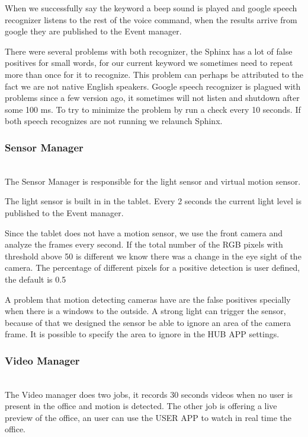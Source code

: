When we successfully say the keyword a beep sound is played and google speech recognizer listens to the rest of the voice command, when the results arrive from google they are published to the Event manager.

There were several problems with both recognizer, the Sphinx has a lot of false positives for small words, for our current keyword we sometimes need to repeat more than once for it to recognize. This problem can perhaps be attributed to the fact we are not native English speakers. 
Google speech recognizer is plagued with problems since a few version ago, it sometimes will not listen and shutdown after some 100 ms. To try to minimize the problem by run a check every 10 seconds. If both speech recognizes are not running we relaunch Sphinx.

\subsubsection{Sensor Manager}\label{sensor_manager_imp}\mbox{}\\

The Sensor Manager is responsible for the light sensor and virtual motion sensor.

The light sensor is built in in the tablet. Every 2 seconds the current light level is published to the Event manager. 

Since the tablet does not have a motion sensor, we use the front camera and analyze the frames every second. If the total number of the RGB pixels with threshold above 50 is different we know there was a change in the eye sight of the camera. The percentage of different pixels for a positive detection is user defined, the default is 0.5%

A problem that motion detecting cameras have are the false positives specially when there is a windows to the outside. A strong light can trigger the sensor, because of that we designed the sensor be able to ignore an area of the camera frame. It is possible to specify the area to ignore in the HUB APP settings.


\subsubsection{Video Manager}\mbox{}\\

The Video manager does two jobs, it records 30 seconds videos when no user is present in the office and motion is detected. The other job is offering a live preview of the office, an user can use the USER APP to watch in real time the office.

